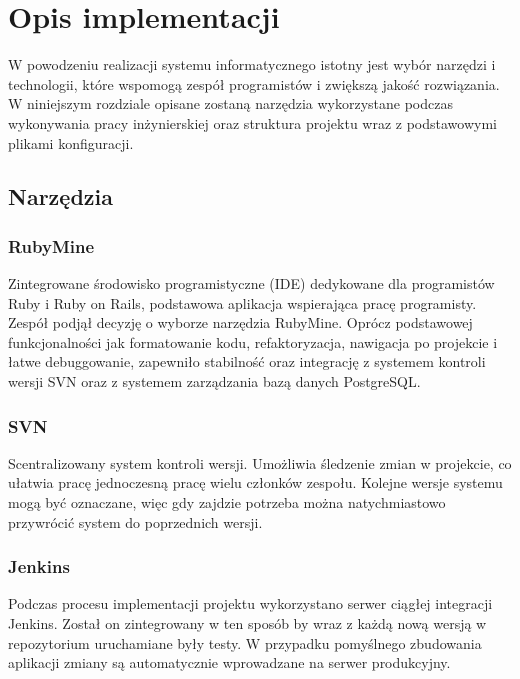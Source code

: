 \chapter{Opis implementacji}
\label{Chapter6}

W powodzeniu realizacji systemu informatycznego istotny jest wybór narzędzi i technologii, które wspomogą zespół programistów i zwiększą jakość rozwiązania. W niniejszym rozdziale opisane zostaną narzędzia wykorzystane podczas wykonywania pracy inżynierskiej oraz struktura projektu wraz z podstawowymi plikami konfiguracji.

\section{Narzędzia}

\subsection{RubyMine}

Zintegrowane środowisko programistyczne (IDE) dedykowane dla programistów Ruby i Ruby on Rails, podstawowa aplikacja wspierająca pracę programisty. Zespół podjął decyzję o wyborze narzędzia RubyMine. Oprócz podstawowej funkcjonalności jak formatowanie kodu, refaktoryzacja, nawigacja po projekcie i łatwe debuggowanie, zapewniło stabilność oraz integrację z systemem kontroli wersji SVN oraz z systemem zarządzania bazą danych PostgreSQL.

\subsection{SVN}

Scentralizowany system kontroli wersji. Umożliwia śledzenie zmian w projekcie, co ułatwia pracę jednoczesną pracę wielu członków zespołu. Kolejne wersje systemu mogą być oznaczane, więc gdy zajdzie potrzeba można natychmiastowo przywrócić system do poprzednich wersji.

\subsection{Jenkins}

Podczas procesu implementacji projektu wykorzystano serwer ciągłej integracji Jenkins. Został on zintegrowany w ten sposób by wraz z każdą nową wersją w repozytorium uruchamiane były testy. W przypadku pomyślnego zbudowania aplikacji zmiany są automatycznie wprowadzane na serwer produkcyjny.

